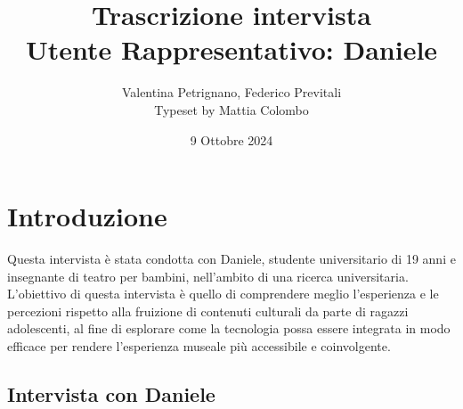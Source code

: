\documentclass{article}
\title{\textbf{Trascrizione intervista}\\ Utente Rappresentativo: Daniele}
\author{Valentina Petrignano, Federico Previtali \\ Typeset by Mattia Colombo}
\date{9 Ottobre 2024}
\begin{document}
\maketitle

\section{Introduzione}
Questa intervista è stata condotta con Daniele, studente universitario di 19 anni e insegnante di teatro per bambini, nell'ambito di una ricerca universitaria. 
L’obiettivo di questa intervista è quello di comprendere meglio l'esperienza e le percezioni rispetto alla fruizione di contenuti culturali da parte di ragazzi adolescenti, al fine di esplorare come la tecnologia possa essere integrata in modo efficace per rendere l’esperienza museale più accessibile e coinvolgente.

\subsection{\textcolor{subsectioncolor}{Intervista con Daniele}}
\end{document}
